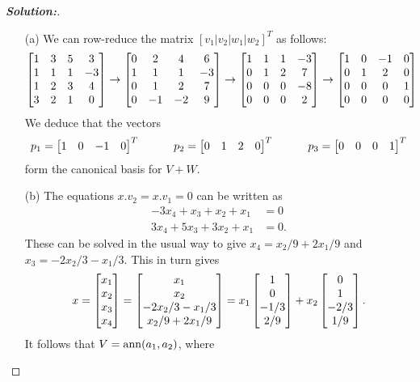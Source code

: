 \documentclass[a4paper]{amsart}
\theoremstyle{definition}
\newenvironment{solution}{\begin{proof}[\textbf{Solution:}] \vphantom{u}}{\end{proof}}
\begin{document}
\begin{solution}
 \begin{itemize}
  \item[(a)] We can row-reduce the matrix $[v_1|v_2|w_1|w_2]^T$ as
   follows: 
   \[ 
    \left[\begin{matrix} 
     1 & 3 & 5 &  3 \\
     1 & 1 & 1 & -3 \\
     1 & 2 & 3 &  4 \\
     3 & 2 & 1 &  0
    \end{matrix}\right]
    \to
    \left[\begin{matrix} 
     0 & 2 & 4 &  6 \\
     1 & 1 & 1 & -3 \\
     0 & 1 & 2 &  7 \\
     0 &-1 &-2 &  9
    \end{matrix}\right]
    \to
    \left[\begin{matrix} 
     1 & 1 & 1 & -3 \\
     0 & 1 & 2 &  7 \\
     0 & 0 & 0 & -8 \\
     0 & 0 & 0 &  2
    \end{matrix}\right]
    \to
    \left[\begin{matrix} 
     1 & 0 &-1 &  0 \\
     0 & 1 & 2 &  0 \\
     0 & 0 & 0 &  1 \\
     0 & 0 & 0 &  0
    \end{matrix}\right]
   \]
   We deduce that the vectors
   \[ 
    p_1 = \left[\begin{matrix} 1&0&-1&0\end{matrix}\right]^T \hspace{3em}
    p_2 = \left[\begin{matrix} 0&1&2&0\end{matrix}\right]^T \hspace{3em}
    p_3 = \left[\begin{matrix} 0&0&0&1\end{matrix}\right]^T
   \]
   form the canonical basis for $V+W$.
  \item[(b)] The equations $x.v_2=x.v_1=0$ can be written as
   \begin{align*}
    -3x_4+x_3+x_2+x_1 &= 0 \\
    3x_4+5x_3+3x_2+x_1 &= 0.
   \end{align*}
   These can be solved in the usual way to give 
   $x_4=x_2/9+2x_1/9$ and $x_3=-2x_2/3-x_1/3$.  This in turn gives
   \[ x = \left[\begin{matrix} x_1\\x_2\\x_3\\x_4 \end{matrix}\right] 
      = \left[\begin{matrix} x_1\\x_2\\-2x_2/3-x_1/3 \\ x_2/9+2x_1/9 \end{matrix}\right]
      = x_1 \left[\begin{matrix} 1 \\ 0 \\ -1/3 \\ 2/9 \end{matrix}\right] + 
        x_2 \left[\begin{matrix} 0 \\ 1 \\ -2/3 \\ 1/9 \end{matrix}\right].
   \]
   It follows that $V=\operatorname{ann}(a_1,a_2)$, where 

\end{itemize}
\end{solution}
\end{document}
